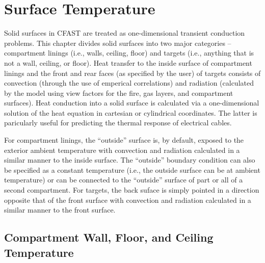 \chapter{Surface Temperature}

Solid surfaces  in CFAST are treated as one-dimensional transient conduction problems. This chapter divides solid surfaces into two major categories -- compartment linings (i.e., walls, ceiling, floor) and targets (i.e., anything that is not a wall, ceiling, or floor). Heat transfer to the inside surface of compartment linings and the front and rear faces (as specified by the user) of targets consists of convection (through the use of emperical correlations) and radiation (calculated by the model using view factors for the fire, gas layers, and compartment surfaces). Heat conduction into a solid surface is calculated via a one-dimensional solution of the heat equation in cartesian or cylindrical coordinates.  The latter is paricularly useful for predicting the thermal response of electrical cables.

For compartment linings, the ``outside'' surface is, by default, exposed to the exterior ambient temperature with convection and radiation calculated in a similar manner to the inside surface.  The ``outside'' boundary condition can also be specified as a constant temperature (i.e., the outside surface can be at ambient temperature) or can be connected to the ``outside'' surface of part or all of a second compartment.  For targets, the back suface is simply pointed in a direction opposite that of the front surface with convection and radiation calculated in a similar manner to the front surface.

\section{ Compartment Wall, Floor, and Ceiling Temperature}

